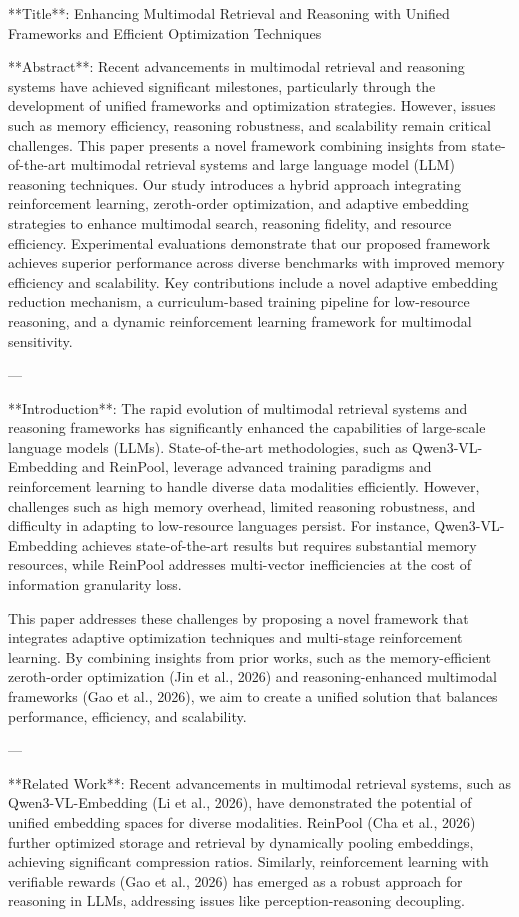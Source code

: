 **Title**: Enhancing Multimodal Retrieval and Reasoning with Unified Frameworks and Efficient Optimization Techniques  

**Abstract**:  
Recent advancements in multimodal retrieval and reasoning systems have achieved significant milestones, particularly through the development of unified frameworks and optimization strategies. However, issues such as memory efficiency, reasoning robustness, and scalability remain critical challenges. This paper presents a novel framework combining insights from state-of-the-art multimodal retrieval systems and large language model (LLM) reasoning techniques. Our study introduces a hybrid approach integrating reinforcement learning, zeroth-order optimization, and adaptive embedding strategies to enhance multimodal search, reasoning fidelity, and resource efficiency. Experimental evaluations demonstrate that our proposed framework achieves superior performance across diverse benchmarks with improved memory efficiency and scalability. Key contributions include a novel adaptive embedding reduction mechanism, a curriculum-based training pipeline for low-resource reasoning, and a dynamic reinforcement learning framework for multimodal sensitivity.  

---

**Introduction**:  
The rapid evolution of multimodal retrieval systems and reasoning frameworks has significantly enhanced the capabilities of large-scale language models (LLMs). State-of-the-art methodologies, such as Qwen3-VL-Embedding and ReinPool, leverage advanced training paradigms and reinforcement learning to handle diverse data modalities efficiently. However, challenges such as high memory overhead, limited reasoning robustness, and difficulty in adapting to low-resource languages persist. For instance, Qwen3-VL-Embedding achieves state-of-the-art results but requires substantial memory resources, while ReinPool addresses multi-vector inefficiencies at the cost of information granularity loss.  

This paper addresses these challenges by proposing a novel framework that integrates adaptive optimization techniques and multi-stage reinforcement learning. By combining insights from prior works, such as the memory-efficient zeroth-order optimization (Jin et al., 2026) and reasoning-enhanced multimodal frameworks (Gao et al., 2026), we aim to create a unified solution that balances performance, efficiency, and scalability.  

---

**Related Work**:  
Recent advancements in multimodal retrieval systems, such as Qwen3-VL-Embedding (Li et al., 2026), have demonstrated the potential of unified embedding spaces for diverse modalities. ReinPool (Cha et al., 2026) further optimized storage and retrieval by dynamically pooling embeddings, achieving significant compression ratios. Similarly, reinforcement learning with verifiable rewards (Gao et al., 2026) has emerged as a robust approach for reasoning in LLMs, addressing issues like perception-reasoning decoupling.  

